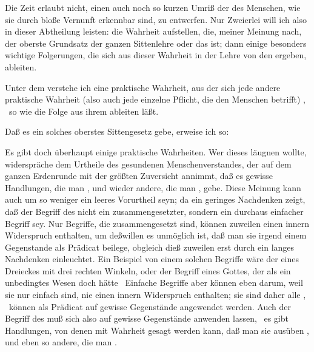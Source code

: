 
Die Zeit erlaubt nicht, einen auch noch so kurzen Umriß der  des Menschen, wie sie durch bloße Vernunft erkennbar sind, zu entwerfen. Nur Zweierlei will ich also in dieser Abtheilung leisten:  die Wahrheit aufstellen, die, meiner Meinung nach, der oberste Grundsatz der ganzen Sittenlehre oder das  ist; dann einige besonders wichtige Folgerungen, die sich aus dieser Wahrheit in der Lehre von den  ergeben, ableiten.~

\begin{aufza}
\item Unter dem  verstehe ich eine praktische Wahrheit, aus der sich jede andere praktische Wahrheit (also auch jede einzelne Pflicht, die den Menschen betrifft) , \dh\ so wie die Folge aus ihrem  ableiten läßt.
\item Daß es ein solches oberstes Sittengesetz gebe, erweise ich so:
\begin{aufzb}
\item Es gibt doch überhaupt einige praktische Wahrheiten. Wer dieses läugnen wollte, widerspräche dem Urtheile des gesundenen Menschenverstandes, der auf dem ganzen Erdenrunde mit der größten Zuversicht annimmt, daß es gewisse Handlungen, die man , und wieder andere, die man , gebe. Diese Meinung kann auch um so weniger ein leeres Vorurtheil seyn; da ein geringes Nachdenken zeigt, daß der Begriff des  nicht ein zusammengesetzter, sondern ein durchaus einfacher Begriff sey. Nur Begriffe, die zusammengesetzt sind, können zuweilen einen innern Widerspruch enthalten, um deßwillen es unmöglich ist, daß man sie irgend einem Gegenstande als Prädicat beilege, obgleich dieß zuweilen erst durch ein langes Nachdenken einleuchtet. Ein Beispiel von einem solchen Begriffe wäre der eines Dreieckes mit drei rechten Winkeln, oder der Begriff eines Gottes, der als ein unbedingtes Wesen doch  hätte \udgl\  Einfache Begriffe aber können eben darum, weil sie nur einfach sind, nie einen innern Widerspruch enthalten; sie sind daher alle , \dh\ können als Prädicat auf gewisse Gegenstände angewendet werden. Auch der Begriff des  muß sich also auf gewisse Gegenstände anwenden lassen, \dh\ es gibt Handlungen, von denen mit Wahrheit gesagt werden kann, daß man sie ausüben , und eben so andere, die man .

\end{aufzb}
\end{aufza}
